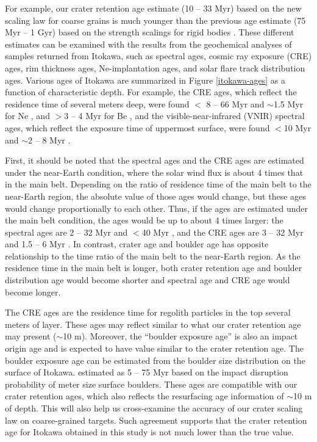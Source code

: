 \documentclass[3p,authoryear]{elsarticle}
\begin{document}
For example, our crater retention age estimate (10 -- 33 Myr) based on the new scaling law for coarse grains is much younger than the previous age estimate (75 Myr -- 1 Gyr) based on the strength scalings for rigid bodies \citep{michel2009}. 
These different estimates can be examined with the results from the geochemical analyses of samples returned from Itokawa, such as spectral ages, cosmic ray exposure (CRE) ages, rim thickness ages, Ne-implantation ages, and solar flare track distribution ages. Various ages of Itokawa are summarized in Figure \ref{itokawa-ages} as a function of characteristic depth. For example, the CRE ages, which reflect the residence time of several meters deep, were found $<$ 8 -- 66 Myr \citep{nagao2011} and $\sim$1.5 Myr for Ne \citep{meier2014}, and $>$3 -- 4 Myr for Be \citep{nishiizumi2015}, and the visible-near-infrared (VNIR) spectral ages, which reflect the exposure time of uppermost surface, were found $<$10 Myr \citep{koga2014} and $\sim$2 -- 8 Myr \citep{bonal2015}.

First, it should be noted that the spectral ages and the CRE ages are estimated under the near-Earth condition, where the solar wind flux is about 4 times that in the main belt. Depending on the ratio of residence time of the main belt to the near-Earth region, the absolute value of those ages would change, but these ages would change proportionally to each other. Thus, if the ages are estimated under the main belt condition, the ages would be up to about 4 times larger: the spectral ages are 2 -- 32 Myr \citep{bonal2015} and $<$40 Myr \citep{koga2014}, and the CRE ages are 3 -- 32 Myr \citep{nagao2011} and 1.5 -- 6 Myr \citep{meier2014}.
In contrast, crater age and boulder age has opposite relationship to the time ratio of the main belt to the near-Earth region. As the residence time in the main belt is longer, both crater retention age and boulder distribution age would become shorter and spectral age and CRE age would become longer.

The CRE ages are the residence time for regolith particles in the top several meters of layer. These ages may reflect similar to what our crater retention age may present ($\sim$10 m). Moreover, the ``boulder exposure age'' is also an impact origin age and is expected to have value similar to the crater retention age. The boulder exposure age can be estimated from the boulder size distribution on the surface of Itokawa. \citet{basilevsky2014} estimated as 5 -- 75 Myr based on the impact disruption probability of meter size surface boulders. These ages are compatible with our crater retention ages, which also reflects the resurfacing age information of $\sim$10 m of depth. This will also help us cross-examine the accuracy of our crater scaling law on coarse-grained targets. Such agreement supports that the crater retention age for Itokawa obtained in this study is not much lower than the true value.
\end{document}
